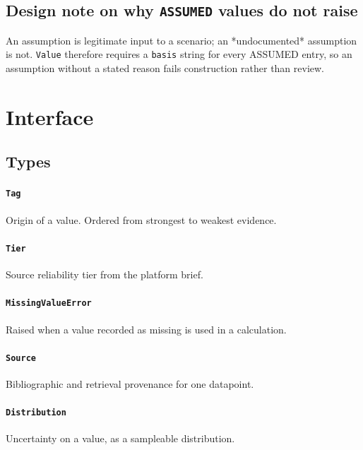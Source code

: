 \documentclass[10pt,a4paper,twoside]{report}
\begin{document}
\subsection*{Design note on why \texttt{ASSUMED} values do not raise}

An assumption is legitimate input to a scenario; an *undocumented* assumption is not. \texttt{Value} therefore requires a \texttt{basis} string for every ASSUMED entry, so an assumption without a stated reason fails construction rather than review.

\section{Interface}

\subsection*{Types}

\paragraph{\texttt{Tag}}

Origin of a value. Ordered from strongest to weakest evidence.

\paragraph{\texttt{Tier}}

Source reliability tier from the platform brief.

\paragraph{\texttt{MissingValueError}}

Raised when a value recorded as missing is used in a calculation.

\paragraph{\texttt{Source}}

Bibliographic and retrieval provenance for one datapoint.

\paragraph{\texttt{Distribution}}

Uncertainty on a value, as a sampleable distribution.
\end{document}
